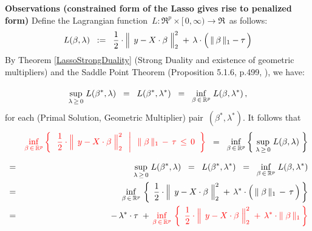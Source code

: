 \vskip 0.5cm
\noindent
\textbf{Observations (constrained form of the Lasso gives rise to penalized form)}
\mbox{}
\vskip 0.2cm
\noindent
Define the Lagrangian function
\,$L : \Re^{p} \times [\,0,\infty) \longrightarrow \Re$\,
as follows:
\begin{equation*}
L(\beta,\lambda)
\;\; := \;\;
	\dfrac{1}{2}
	\cdot
	\left\Vert\;\, y \overset{{\color{white}.}}{-} X\cdot\beta \;\right\Vert_{2}^{2}
	\; + \,
	\lambda\cdot\left(\,\Vert\,\beta\,\Vert_{1} \overset{{\color{white}.}}{-} \tau\,\right)
\end{equation*}
By Theorem \ref{LassoStrongDuality} (Strong Duality and existence of geometric multipliers)
and the Saddle Point Theorem (Proposition 5.1.6, p.499, \cite{Bertsekas1999}),
we have:
\begin{equation*}
\overset{{\color{white}1}}{\underset{\lambda\,\geq\,0}{\sup}\; L(\beta^{*},\lambda)}
\;\; = \;\;
	L(\beta^{*},\lambda^{*})
\;\; = \;\;
	\underset{\beta\,\in\,\Re^{p}}{\inf}\; L(\beta,\lambda^{*})\,,
\end{equation*}
for each (Primal Solution, Geometric Multiplier) pair \,$(\beta^{*},\lambda^{*})$.
It follows that
\begin{eqnarray*}
&&
	{\color{red}\underset{\beta\,\in\,\Re^{p}}{\inf}
	\left\{\;\;
		\left.
		\dfrac{1}{2}
		\cdot
		\left\Vert\;\, y \overset{{\color{white}.}}{-} X\cdot\beta \;\right\Vert_{2}^{2}
		\;\;\,\right\vert\;\;
		\Vert\;\beta\,\Vert_{1} \, - \, \tau \, \leq \, 0
		\;\;\right\}}
\;\; = \;\;
	\underset{\beta\,\in\,\Re^{p}}{\inf}
	\left\{\;
		\underset{\lambda\,\geq\,0}{\sup}\; L(\beta,\lambda)
		\;\right\}
\\
& = &
	\overset{{\color{white}1}}{\underset{\lambda\,\geq\,0}{\sup}\; L(\beta^{*},\lambda)}
	\;\; = \;\;
		L(\beta^{*},\lambda^{*})
	\;\; = \;\;
		\underset{\beta\,\in\,\Re^{p}}{\inf}\; L(\beta,\lambda^{*})
\\
& = &
	\underset{\beta\,\in\,\Re^{p}}{\inf}\,
	\left\{\;\,
		\dfrac{1}{2}
		\cdot
		\left\Vert\;\, y \overset{{\color{white}.}}{-} X\cdot\beta \;\right\Vert_{2}^{2}
		\; + \,
		\lambda^{*}
		\cdot
		\left(\, \Vert\;\beta\,\Vert_{1} \, \overset{{\color{white}.}}{-} \, \tau \,\right) \,\right\}
\\
& = &
	-\,\lambda^{*}\cdot\tau
	\; + \,
	{\color{red}\underset{\beta\,\in\,\Re^{p}}{\inf}\,
	\left\{\;\,
		\dfrac{1}{2}
		\cdot
		\left\Vert\;\, y \overset{{\color{white}.}}{-} X\cdot\beta \;\right\Vert_{2}^{2}
		\; + \,
		\lambda^{*} \cdot \Vert\;\beta\,\Vert_{1} 
		\,\right\}}
\end{eqnarray*}
